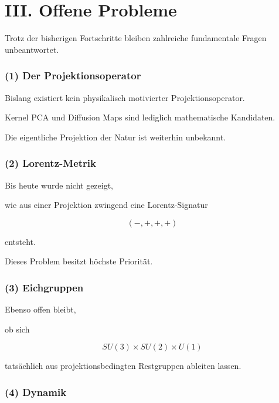 \section*{III. Offene Probleme}

Trotz der bisherigen Fortschritte bleiben zahlreiche fundamentale Fragen unbeantwortet.


\subsubsection*{(1) Der Projektionsoperator}

Bislang existiert kein physikalisch motivierter Projektionsoperator.

Kernel PCA und Diffusion Maps sind lediglich mathematische Kandidaten.

Die eigentliche Projektion der Natur ist weiterhin unbekannt.


\subsubsection*{(2) Lorentz-Metrik}

Bis heute wurde nicht gezeigt,

wie aus einer Projektion zwingend eine Lorentz-Signatur

\[
(-,+,+,+)
\]

entsteht.

Dieses Problem besitzt höchste Priorität.


\subsubsection*{(3) Eichgruppen}

Ebenso offen bleibt,

ob sich

\[
SU(3)
\times
SU(2)
\times
U(1)
\]

tatsächlich aus projektionsbedingten Restgruppen ableiten lassen.


\subsubsection*{(4) Dynamik}

